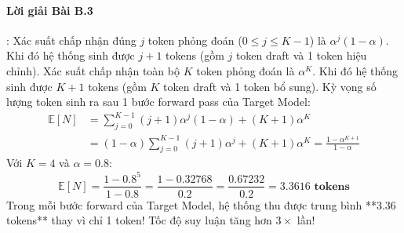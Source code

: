 \paragraph{Lời giải Bài B.3}:
Xác suất chấp nhận đúng $j$ token phỏng đoán ($0 \le j \le K-1$) là $\alpha^j (1 - \alpha)$. Khi đó hệ thống sinh được $j + 1$ tokens (gồm $j$ token draft và 1 token hiệu chỉnh).
Xác suất chấp nhận toàn bộ $K$ token phỏng đoán là $\alpha^K$. Khi đó hệ thống sinh được $K + 1$ tokens (gồm $K$ token draft và 1 token bổ sung).
Kỳ vọng số lượng token sinh ra sau 1 bước forward pass của Target Model:
\begin{align*}
\mathbb{E}[N] &= \sum_{j=0}^{K-1} (j + 1) \alpha^j (1 - \alpha) + (K + 1) \alpha^K \\
&= (1 - \alpha) \sum_{j=0}^{K-1} (j + 1) \alpha^j + (K + 1) \alpha^K = \frac{1 - \alpha^{K+1}}{1 - \alpha}
\end{align*}
Với $K = 4$ và $\alpha = 0.8$:
\begin{equation*}
\mathbb{E}[N] = \frac{1 - 0.8^5}{1 - 0.8} = \frac{1 - 0.32768}{0.2} = \frac{0.67232}{0.2} = \mathbf{3.3616\text{ tokens}}
\end{equation*}
Trong mỗi bước forward của Target Model, hệ thống thu được trung bình **3.36 tokens** thay vì chỉ 1 token! Tốc độ suy luận tăng hơn $3\times$ lần!

